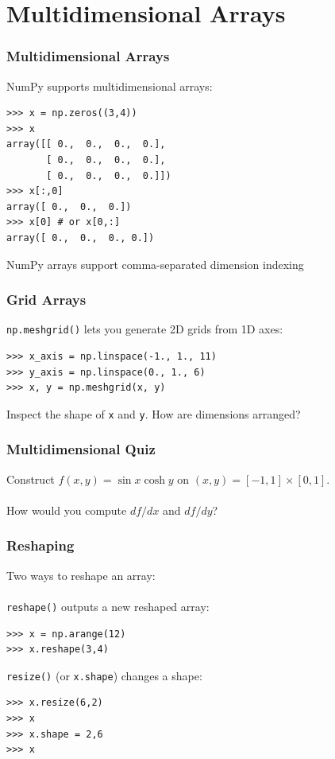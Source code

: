 \documentclass[red]{beamer}
\begin{document}
\section[Dimensions]{Multidimensional Arrays}
\begin{frame}[fragile]
    \frametitle{Multidimensional Arrays}

    NumPy supports multidimensional arrays:
    \begin{lstlisting}
>>> x = np.zeros((3,4))
>>> x
array([[ 0.,  0.,  0.,  0.],
       [ 0.,  0.,  0.,  0.],
       [ 0.,  0.,  0.,  0.]])
>>> x[:,0]
array([ 0.,  0.,  0.])
>>> x[0] # or x[0,:]
array([ 0.,  0.,  0., 0.])
    \end{lstlisting}
    NumPy arrays support comma-separated dimension indexing

\end{frame}
\begin{frame}[fragile]
    \frametitle{Grid Arrays}

    \lstinline|np.meshgrid()| lets you generate 2D grids from 1D axes:
    \begin{lstlisting}
>>> x_axis = np.linspace(-1., 1., 11)
>>> y_axis = np.linspace(0., 1., 6)
>>> x, y = np.meshgrid(x, y)
    \end{lstlisting}
    Inspect the shape of \lstinline|x| and \lstinline|y|. How are dimensions arranged?

\end{frame}
\begin{frame}
    \frametitle{Multidimensional Quiz}

    Construct $f(x,y) = \sin x \cosh y$ on $(x,y) = [-1,1]\times[0,1]$.
    \\~\\
    How would you compute $df/dx$ and $df/dy$?
\end{frame}
\begin{frame}[fragile]
    \frametitle{Reshaping}
    Two ways to reshape an array:
    \\~\\
    \lstinline|reshape()| outputs a new reshaped array:
    \begin{lstlisting}
>>> x = np.arange(12)
>>> x.reshape(3,4)
    \end{lstlisting}
    
    \lstinline|resize()| (or \lstinline|x.shape|) changes a shape:
    \begin{lstlisting}
>>> x.resize(6,2)
>>> x
>>> x.shape = 2,6
>>> x
    \end{lstlisting}
\end{frame}
\end{document}
